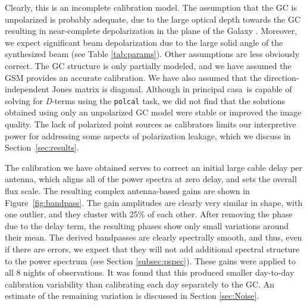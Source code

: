 \documentclass[twocolumn, trackchanges]{aastex61}
\newcommand{\casa}{{\sc casa}}
\begin{document}
Clearly, this is an incomplete calibration model.  The assumption that the GC is
unpolarized is probably adequate, due to the large optical depth towards the GC
\citep{Oppermann.12} resulting in near-complete depolarization in the plane of
the Galaxy \citep{Wolleben.06}.  Moreover, we expect significant beam
depolarization due to the large solid angle of the synthesized beam (see Table
\ref{tab:params}).  Other assumptions are less obviously correct.  The GC
structure is only partially modeled, and we have assumed the GSM provides an
accurate calibration.  We have also assumed that the direction-independent Jones
matrix is diagonal.  Although in principal \casa\ is capable of solving for
\textit{D}-terms using the {\tt polcal} task, we did not find that the solutions
obtained using only an unpolarized GC model were stable or improved the image
quality.  The lack of polarized point sources as calibrators limits our
interpretive power for addressing some aspects of polarization leakage, which we
discuss in Section~\ref{sec:results}.

The calibration we have obtained serves to correct an initial large cable delay
per antenna, which aligns all of the power spectra at zero delay, and sets the
overall flux scale.  The resulting complex antenna-based gains are shown in
Figure~\ref{fig:bandpass}.  The gain amplitudes are clearly very similar in
shape, with one outlier, and they cluster with 25\% of each other.  After
removing the phase due to the delay term, the resulting phases show only small
variations around their mean.  The derived bandpasses are clearly spectrally
smooth, and thus, even if there are errors, we expect that they will not add
additional spectral structure to the power spectrum (see Section
\ref{subsec:pspec}).  These gains were applied to all 8 nights of
observations. It was found that this produced smaller day-to-day calibration
variability than calibrating each day separately to the GC.  An estimate of the
remaining variation is discussed in Section \ref{sec:Noise}.
\end{document}
